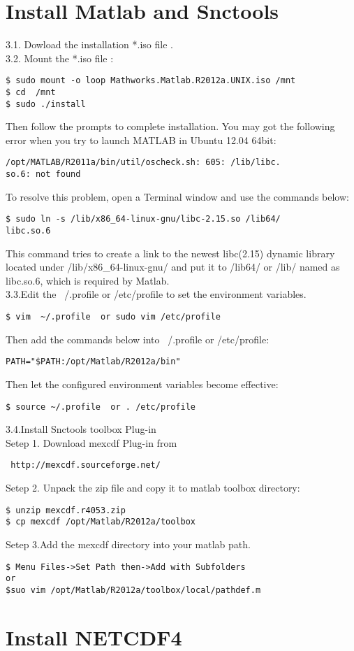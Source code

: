 \documentclass[paper=a4, fontsize=11pt]{scrartcl}
\numberwithin{equation}{section}
\numberwithin{figure}{section}
\numberwithin{table}{section}
\begin{document}
\LARGE{\section{Install Matlab and Snctools}}
\Large{3.1}. Dowload the installation *.iso file .
\\
\Large{3.2}. Mount the *.iso file :
{\color{blue}\begin{verbatim}
$ sudo mount -o loop Mathworks.Matlab.R2012a.UNIX.iso /mnt 
$ cd  /mnt
$ sudo ./install
\end{verbatim}}
Then follow the prompts to complete installation.  
You may got the following error when you try to launch MATLAB in Ubuntu 12.04 64bit: 
{\color{blue}\begin{verbatim}
/opt/MATLAB/R2011a/bin/util/oscheck.sh: 605: /lib/libc.
so.6: not found
\end{verbatim}}
To resolve this problem, open a Terminal window and use the commands below:
{\color{blue}\begin{verbatim}
$ sudo ln -s /lib/x86_64-linux-gnu/libc-2.15.so /lib64/ 
libc.so.6
\end{verbatim}}
This command tries to create a link to the newest libc(2.15) dynamic library located under
/lib/x86\_64-linux-gnu/ and put it to /lib64/ or /lib/ named as libc.so.6, 
which is required by Matlab. 
\\
\Large{3.3}.Edit the ~/.profile  or /etc/profile to set the environment variables.
{\color{Brown}\begin{verbatim}
$ vim  ~/.profile  or sudo vim /etc/profile
\end{verbatim}}
Then add the commands below into ~/.profile  or /etc/profile:
{\color{blue}\begin{verbatim}
PATH="$PATH:/opt/Matlab/R2012a/bin"
\end{verbatim}}
Then let the configured environment variables become effective:
{\color{blue}\begin{verbatim}
$ source ~/.profile  or . /etc/profile
\end{verbatim}}
\Large{3.4}.Install Snctools toolbox Plug-in
\\
\large{Setep 1}. Download mexcdf Plug-in from
{\color{Brown}\begin{verbatim}
 http://mexcdf.sourceforge.net/
\end{verbatim}}
\large{Setep 2}. Unpack the zip file and copy it to matlab toolbox directory:
{\color{Brown}\begin{verbatim}
$ unzip mexcdf.r4053.zip
$ cp mexcdf /opt/Matlab/R2012a/toolbox
\end{verbatim}}
\large{Setep 3}.Add the mexcdf directory into your matlab path.
{\color{Brown}\begin{verbatim}
$ Menu Files->Set Path then->Add with Subfolders
or 
$suo vim /opt/Matlab/R2012a/toolbox/local/pathdef.m
\end{verbatim}}
\LARGE{\section{Install NETCDF4}}
\end{document}
